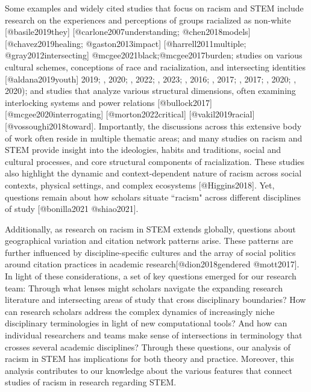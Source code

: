 {{Some examples and widely cited studies that focus on racism and STEM include research on the experiences and perceptions of groups racialized as non-white [@basile2019they] [@carlone2007understanding; @chen2018models] [@chavez2019healing; @gaston2013impact] [@harrell2011multiple; @gray2012intersecting] @mcgee2021black;@mcgee2017burden; studies on various cultural schemes, conceptions of race and racialization, and intersecting identities [@aldana2019youth] 2019; \cite{dancy2020undergraduates}, 2020; \cite{Leyva2022}, 2022; \cite{Leyva2023}, 2023; \cite{mcgee2016devalued}, 2016; \cite{mcgee2017troubled}, 2017; \cite{nasir2017stem}, 2017; \cite{tate2020whiteliness}, 2020; \cite{wen2020effects}, 2020); and studies that analyze various structural dimensions, often examining interlocking systems and power relations [@bullock2017] [@mcgee2020interrogating] [@morton2022critical] [@vakil2019racial] [@vossoughi2018toward]. Importantly, the discussions across this extensive body of work often reside in multiple thematic areas; and many studies on racism and STEM provide insight into the ideologies, habits and traditions, social and cultural processes, and core structural components of racialization. These studies also highlight the dynamic and context-dependent nature of racism across social contexts, physical settings, and complex ecosystems [@Higgins2018]. Yet, questions remain about how scholars situate ``racism" across different disciplines of study [@bonilla2021 @shiao2021]. 

Additionally, as research on racism in STEM extends globally, questions about geographical variation and citation network patterns arise. These patterns are further influenced by discipline-specific cultures and the array of social politics around citation practices in academic research[@dion2018gendered @mott2017]. In light of these considerations, a set of key questions emerged for our research team: Through what lenses might scholars navigate the expanding research literature and intersecting areas of study that cross disciplinary boundaries? How can research scholars address the complex dynamics of increasingly niche disciplinary terminologies in light of new computational tools? And how can individual researchers and teams make sense of intersections in terminology that crosses several academic disciplines? Through these questions, our analysis of racism in STEM has implications for both theory and practice. Moreover, this analysis contributes to our knowledge about the various features that connect studies of racism in research regarding STEM.

}}
